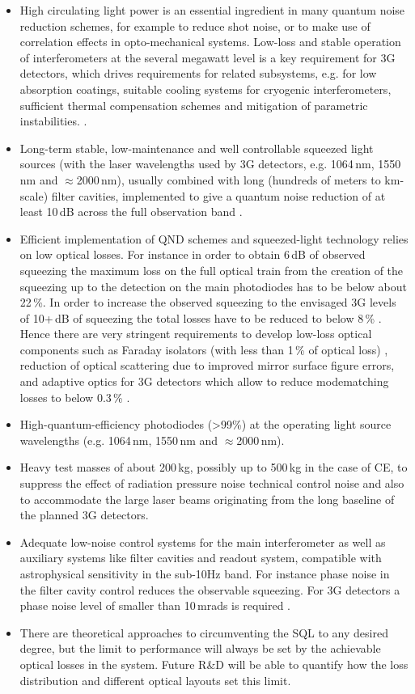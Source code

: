 \begin{itemize}
\item High circulating light power is an essential ingredient in many quantum noise reduction schemes, for example to reduce shot noise, or to make use of correlation effects in opto-mechanical systems. Low-loss and stable operation of interferometers at the several megawatt level   is a key requirement for 3G detectors,  which drives requirements for related subsystems, e.g.  for low absorption coatings, suitable cooling systems for cryogenic interferometers, sufficient thermal compensation schemes and mitigation of parametric instabilities.  .
\item  Long-term  stable,  low-maintenance  and well controllable squeezed light sources (with the laser wavelengths used by 3G detectors, e.g. 1064\,nm, 1550\,nm and $\approx$2000\,nm), usually combined with long (hundreds  of meters to km-scale) filter cavities, implemented to give a quantum noise reduction of  at least  10\,dB  across the full observation band .
\item Efficient implementation of QND schemes and squeezed-light technology relies on  low optical losses. For instance in order to obtain 6\,dB of observed squeezing the maximum loss on the full optical train from the creation of the squeezing up to the detection on the main photodiodes has to be below about 22\,\%. In order to increase the observed squeezing to the envisaged 3G levels of 10+\,dB of squeezing the total losses have to be reduced to below 8\,\% \cite{LSC_IS_WP}. Hence there are very stringent requirements to develop  low-loss optical components such as Faraday isolators (with less than 1\,\% of optical loss) , reduction of optical scattering due to improved mirror surface figure errors, and adaptive optics for 3G detectors  which allow to reduce modematching losses to below 0.3\,\% . 
\item High-quantum-efficiency photodiodes (>99\%) at the operating light source wavelengths (e.g. 1064\,nm, 1550\,nm and $\approx$2000\,nm).
\item Heavy test masses of about 200\,kg,  possibly up to 500\,kg in the case of CE,  to suppress the effect of radiation pressure noise technical control noise and also to accommodate the large laser beams originating from the long baseline of the planned 3G detectors.
\item Adequate low-noise control systems for the main interferometer as well as auxiliary systems like filter cavities and readout system, compatible with astrophysical sensitivity in the sub-10Hz band.
For instance phase noise in the filter cavity control reduces the observable squeezing. For 3G detectors a phase noise level of smaller than 10\,mrads is required \cite{LSC_IS_WP}.
\item There are theoretical approaches to circumventing the SQL to any desired degree, but the limit to performance will always be set by the achievable optical losses in the system. Future R\&D will be able to quantify how the loss distribution and different optical layouts set this limit.
\end{itemize}

